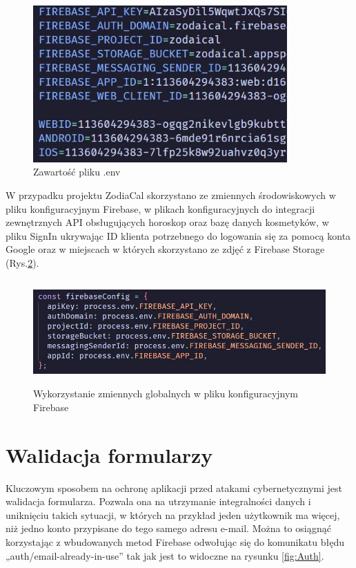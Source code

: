 \begin{figure}[ht]
	\centering
	\vspace{0.25cm}
	\includegraphics[height=6cm]{images/bezpieczenstwo/env}
	\caption{Zawartość pliku .env}
	\label{fig:Env}
\end{figure}

\newpage
W przypadku projektu ZodiaCal skorzystano ze zmiennych środowiskowych w pliku konfiguracyjnym Firebase, w plikach konfiguracyjnych do integracji zewnętrznych API obsługujących horoskop oraz bazę danych kosmetyków, w pliku SignIn ukrywając ID klienta potrzebnego do logowania się za pomocą konta Google oraz w miejscach w których skorzystano ze zdjęć z Firebase Storage (Rys.\ref{fig:FirebaseConfig}).

\begin{figure}[ht]
	\centering
	\vspace{0.25cm}
	\includegraphics[height=4cm]{images/bezpieczenstwo/firebaseConfig}
	\caption{Wykorzystanie zmiennych globalnych w pliku konfiguracyjnym Firebase}
	\label{fig:FirebaseConfig}
\end{figure}

\section*{Walidacja formularzy}
Kluczowym sposobem na ochronę aplikacji przed atakami cybernetycznymi jest walidacja formularza. Pozwala ona na utrzymanie integralności danych i uniknięciu takich sytuacji, w których na przykład jeden użytkownik ma więcej, niż jedno konto przypisane do tego samego adresu e-mail. Można to osiągnąć korzystając z wbudowanych metod Firebase odwołując się do komunikatu błędu „auth/email-already-in-use” tak jak jest to widoczne na rysunku \ref{fig:Auth}.

